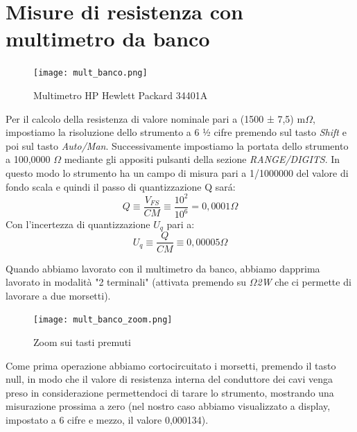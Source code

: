\vspace{1cm}
\section{Misure di resistenza con multimetro da banco}
\label{sec:mult}


\begin{figure}[h]
    \centering
    \texttt{[image: mult\_banco.png]}
    \caption{Multimetro HP Hewlett Packard 34401A}
    \label{fig:mult_banco}
\end{figure}
\FloatBarrier

Per il calcolo della resistenza di valore nominale pari a (1500 ± 7,5) m$\Omega$, impostiamo la risoluzione dello strumento a 6 ½ cifre premendo sul tasto \emph{Shift} e poi sul tasto \emph{Auto/Man}. Successivamente impostiamo la portata dello strumento a 100,0000 $\Omega$ mediante gli appositi pulsanti della sezione \emph{RANGE/DIGITS}. In questo modo lo strumento ha un campo di misura 
pari a 1/1000000 del valore di fondo scala e quindi il passo di quantizzazione Q sar\'a: 
\begin{equation}
    Q \equiv \frac{V_{FS}}{CM} \equiv \frac{10^2}{10^6} = 0,0001 \Omega
\end{equation}
Con l'incertezza di quantizzazione $U_q$ pari a:
\begin{equation}
    U_q \equiv \frac{Q}{CM} \equiv 0,00005 \Omega
\end{equation}

Quando abbiamo lavorato con il multimetro da banco, abbiamo dapprima lavorato in modalità "2 terminali" (attivata premendo su  \emph{$\Omega$2W} che ci permette di lavorare a due morsetti).

\begin{figure}[h]
    \centering
    \texttt{[image: mult\_banco\_zoom.png]}
    \caption{Zoom sui tasti premuti}
    \label{fig:mult_banco_zoom}
\end{figure}
\FloatBarrier

Come prima operazione abbiamo cortocircuitato i morsetti, premendo il tasto null, in modo che il valore di resistenza interna del conduttore dei cavi venga preso in considerazione permettendoci di tarare lo strumento, mostrando una misurazione prossima a zero (nel nostro caso abbiamo visualizzato a display, impostato a 6 cifre e mezzo, il valore 0,000134).


